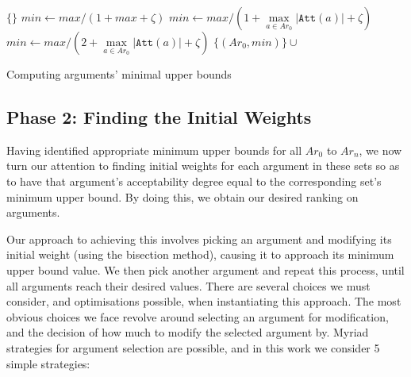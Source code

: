 \documentclass{article}
\newcommand{\Att}{\mathtt{Att}}
\begin{document}
\begin{algorithm}
\begin{algorithmic}
\State \Return $\{\}$
\EndFunction\medskip
{}
\Switch{$\sigma$}
  $min \gets max/(1+max+\zeta)$
\EndCase
{}
  $min \gets max/(1+\max\limits_{a \in Ar_0} |\Att(a)|+\zeta)$
\EndCase  
{}
  $min \gets max/(2+\max\limits_{a \in Ar_0} |\Att(a)|+\zeta)$
\EndCase
\EndSwitch
\State \Return $\{(Ar_0,min)\} \cup$ 
\EndFunction
\medskip


\Return {}
\EndFunction
\end{algorithmic}
\caption{Computing arguments' minimal upper bounds} \label{alg:mub}
\end{algorithm}



\subsection{Phase 2: Finding the Initial Weights}
\label{sec:phase2}
Having identified appropriate minimum upper bounds for all $Ar_0$ to $Ar_n$, we now turn our attention to finding initial weights for each argument in these sets so as to have that argument's acceptability degree equal to the corresponding set's minimum upper bound. By doing this, we obtain our desired ranking on arguments.

Our approach to achieving this involves picking an argument and modifying its initial weight (using the bisection method), causing it to approach its minimum upper bound value. We then pick another argument and repeat this process, until all arguments reach their desired values. There are several choices we must consider, and optimisations possible, when instantiating this approach. The most obvious choices we face revolve around selecting an argument for modification, and the decision of how much to modify the selected argument by.
%
Myriad strategies for argument selection are possible, and in this work we consider 5 simple strategies:
\end{document}
